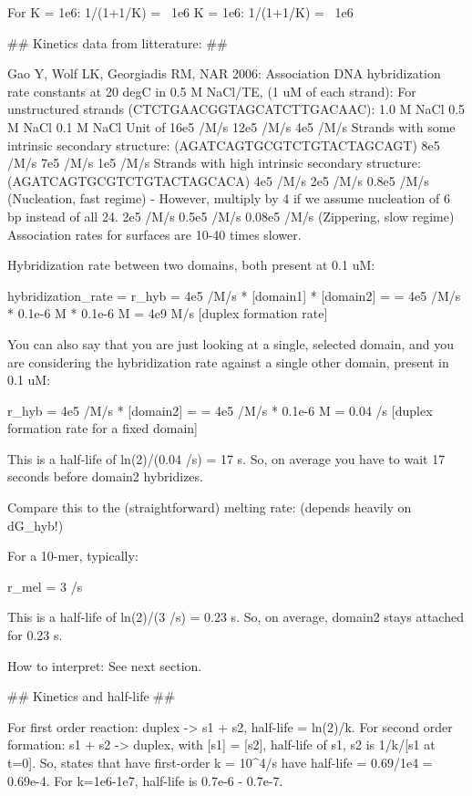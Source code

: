 For
    K = 1e6: 1/(1+1/K) =~ 1e6
    K = 1e6: 1/(1+1/K) =~ 1e6



## Kinetics data from litterature: ##

Gao Y, Wolf LK, Georgiadis RM, NAR 2006:
     Association DNA hybridization rate constants at
     20 degC in 0.5 M NaCl/TE, (1 uM of each strand):
     For unstructured strands (CTCTGAACGGTAGCATCTTGACAAC):
        1.0 M NaCl  0.5 M NaCl  0.1 M NaCl      Unit of
        16e5 /M/s   12e5 /M/s   4e5 /M/s
     Strands with some intrinsic secondary structure: (AGATCAGTGCGTCTGTACTAGCAGT)
        8e5 /M/s    7e5 /M/s    1e5 /M/s
     Strands with high intrinsic secondary structure: (AGATCAGTGCGTCTGTACTAGCACA)
        4e5 /M/s    2e5 /M/s    0.8e5 /M/s  (Nucleation, fast regime)
         - However, multiply by 4 if we assume nucleation of 6 bp instead of all 24.
        2e5 /M/s    0.5e5 /M/s  0.08e5 /M/s (Zippering, slow regime)
    Association rates for surfaces are 10-40 times slower.


Hybridization rate between two domains, both present at 0.1 uM:

    hybridization_rate = r_hyb = 4e5 /M/s * [domain1] * [domain2] =
        = 4e5 /M/s * 0.1e-6 M * 0.1e-6 M = 4e9 M/s   [duplex formation rate]

You can also say that you are just looking at a single, selected domain,
and you are considering the hybridization rate
against a single other domain, present in 0.1 uM:

    r_hyb = 4e5 /M/s * [domain2] =
        = 4e5 /M/s * 0.1e-6 M = 0.04 /s   [duplex formation rate for a fixed domain]

    This is a half-life of ln(2)/(0.04 /s) = 17 s.
    So, on average you have to wait 17 seconds before domain2 hybridizes.

Compare this to the (straightforward) melting rate: (depends heavily on dG_hyb!)

For a 10-mer, typically:

    r_mel = 3 /s

    This is a half-life of ln(2)/(3 /s) = 0.23 s.
    So, on average, domain2 stays attached for 0.23 s.


How to interpret: See next section.



## Kinetics and half-life ##

For first order reaction: duplex -> s1 + s2, half-life = ln(2)/k.
For second order formation: s1 + s2 -> duplex, with [s1] = [s2],
half-life of s1, s2 is 1/k/[s1 at t=0].
So, states that have first-order k = 10^4/s have half-life = 0.69/1e4 = 0.69e-4.
For k=1e6-1e7, half-life is 0.7e-6 - 0.7e-7.


